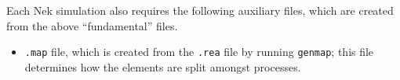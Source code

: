\documentclass[10pt]{article}
\numberwithin{equation}{section} %
\begin{document}

Each Nek simulation also requires the following auxiliary files, which are created from the above ``fundamental'' files.

\begin{itemize}
\item {\tt .map} file, which is created from the {\tt .rea} file by running {\tt genmap}; this file determines how the elements are split amongst processes. 
\end{itemize}
\end{document}

